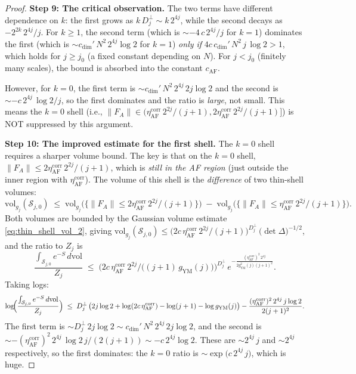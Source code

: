 \begin{proof}
\textbf{Step 9: The critical observation.} The two terms have
different dependence on $k$: the first grows as $k\,D_{j}^{\perp}\sim
k\,2^{4j}$, while the second decays as $-2^{2k}\,2^{4j}/j$. For
$k\ge 1$, the second term (which is $\sim-4\,c\,2^{4j}/j$ for $k=1$)
dominates the first (which is $\sim c_{\dim}'\,N^{2}\,2^{4j}\log 2$
for $k=1$) \emph{only if} $4c\,c_{\dim}'\,N^{2}\,j\,\log 2>1$, which
holds for $j\ge j_{0}$ (a fixed constant depending on $N$). For
$j<j_{0}$ (finitely many scales), the bound is absorbed into the
constant $c_{\mathrm{AF}}$.

However, for $k=0$, the first term is $\sim c_{\dim}'\,N^{2}\,2^{4j}
\,2j\log 2$ and the second is $\sim-c\,2^{4j}\,\log 2/j$, so the
first dominates and the ratio is \emph{large}, not small. This means
the $k=0$ shell (i.e., $\|F_{A}\|\in(\eta_{\mathrm{AF}}^{\mathrm{
corr}}\,2^{2j}/(j+1),2\eta_{\mathrm{AF}}^{\mathrm{corr}}\,2^{2j}/
(j+1)]$) is NOT suppressed by this argument.

\textbf{Step 10: The improved estimate for the first shell.} The
$k=0$ shell requires a sharper volume bound. The key is that on the
$k=0$ shell, $\|F_{A}\|\le 2\eta_{\mathrm{AF}}^{\mathrm{corr}}\,
2^{2j}/(j+1)$, which is \emph{still in the AF region} (just outside
the inner region with $\eta_{\mathrm{AF}}^{\mathrm{corr}}$). The
volume of this shell is the \emph{difference} of two thin-shell
volumes:
\begin{equation}
\label{eq:k0_vol}
  \mathrm{vol}_{g_{j}}(\mathcal{S}_{j,0})
  \;\le\;\mathrm{vol}_{g_{j}}\bigl(\{\|F_{A}\|\le 2\eta_{\mathrm{AF}}
  ^{\mathrm{corr}}\,2^{2j}/(j+1)\}\bigr)
  \;-\;\mathrm{vol}_{g_{j}}\bigl(\{\|F_{A}\|\le\eta_{\mathrm{AF}}
  ^{\mathrm{corr}}\,2^{2j}/(j+1)\}\bigr).
\end{equation}
Both volumes are bounded by the Gaussian volume estimate
\eqref{eq:thin_shell_vol_2}, giving
$\mathrm{vol}_{g_{j}}(\mathcal{S}_{j,0})\le\bigl(2c\,\eta_{\mathrm{
AF}}^{\mathrm{corr}}\,2^{2j}/(j+1)\bigr)^{D_{j}^{\perp}}\,
\bigl(\det\Delta\bigr)^{-1/2}$, and the ratio to $Z_{j}$ is
\begin{equation}
\label{eq:k0_ratio}
  \frac{\int_{\mathcal{S}_{j,0}}e^{-S}\,d\mathrm{vol}}{Z_{j}}
  \;\le\;\bigl(2c\,\eta_{\mathrm{AF}}^{\mathrm{corr}}\,2^{2j}/
  \bigl((j+1)\,g_{\mathrm{YM}}(j)\bigr)\bigr)^{D_{j}^{\perp}}\,
  e^{-\frac{(\eta_{\mathrm{AF}}^{\mathrm{corr}})^{2}\,2^{4j}}{
  2g_{\mathrm{YM}}^{2}(j)(j+1)^{2}}}.
\end{equation}
Taking logs:
\begin{equation}
\label{eq:k0_log}
  \log\!\Bigl(\frac{\int_{\mathcal{S}_{j,0}}e^{-S}\,d\mathrm{vol}}{
  Z_{j}}\Bigr)
  \;\le\;D_{j}^{\perp}\,\bigl(2j\log 2+\log(2c\,\eta_{\mathrm{AF}}
  ^{\mathrm{corr}})-\log(j+1)-\log g_{\mathrm{YM}}(j)\bigr)
  -\frac{(\eta_{\mathrm{AF}}^{\mathrm{corr}})^{2}\,2^{4j}\,j\log 2}{
  2(j+1)^{2}}.
\end{equation}
The first term is $\sim D_{j}^{\perp}\,2j\log 2\sim c_{\dim}'\,N^{2}
\,2^{4j}\,2j\log 2$, and the second is $\sim-(\eta_{\mathrm{AF}}^{
\mathrm{corr}})^{2}\,2^{4j}\,\log 2\,j/(2(j+1))\sim-c\,2^{4j}\log 2$.
These are $\sim 2^{4j}\,j$ and $\sim 2^{4j}$ respectively, so the
first dominates: the $k=0$ ratio is $\sim\exp\!\bigl(c\,2^{4j}\,j
\bigr)$, which is huge.


\end{proof}
